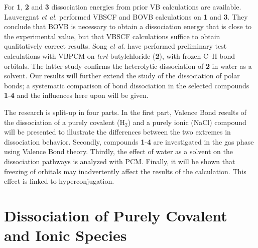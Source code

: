For \textbf{1}, \textbf{2} and \textbf{3} dissociation energies from prior VB calculations are available. Lauvergnat \textit{et al.} \cite{lauvergnat} performed VBSCF and BOVB \cite{bovb1,bovb2,bovb3} calculations on \textbf{1} and \textbf{3}. They conclude that BOVB is necessary to obtain a dissociation energy  that is close to the experimental value, but that VBSCF calculations suffice to obtain qualitatively correct results.  Song \textit{et al.} \cite{song} have performed preliminary test calculations with VBPCM on \textit{tert}-butylchloride (\textbf{2}), with frozen C--H bond orbitals. The latter study confirms the heterolytic dissociation of \textbf{2} in water as a solvent.  Our results will further extend the study of the dissociation of polar bonds; a systematic comparison of bond dissociation in the selected compounds \textbf{1}-\textbf{4} and the influences here upon will be given.

The research is split-up in four parts.  In the first part, Valence Bond results of the dissociation of a purely covalent (H$_2$) and a purely ionic (NaCl) compound will be presented to illustrate the differences between the two extremes in dissociation behavior.
Secondly, compounds \textbf{1}-\textbf{4} are investigated in the gas phase using Valence Bond theory. Thirdly, the effect of water as a solvent on the dissociation pathways is analyzed  with PCM. Finally, it will be shown that freezing of orbitals may inadvertently affect the results of the calculation. This effect is linked to hyperconjugation.

\section{Dissociation of Purely Covalent and Ionic Species}

